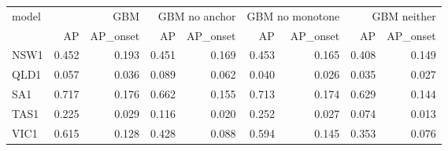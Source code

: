 \begin{tabular}{lrrrrrrrr}
\toprule
model & \multicolumn{2}{r}{GBM} & \multicolumn{2}{r}{GBM no anchor} & \multicolumn{2}{r}{GBM no monotone} & \multicolumn{2}{r}{GBM neither} \\
 & AP & AP\_onset & AP & AP\_onset & AP & AP\_onset & AP & AP\_onset \\
\midrule
NSW1 & 0.452 & 0.193 & 0.451 & 0.169 & 0.453 & 0.165 & 0.408 & 0.149 \\
QLD1 & 0.057 & 0.036 & 0.089 & 0.062 & 0.040 & 0.026 & 0.035 & 0.027 \\
SA1 & 0.717 & 0.176 & 0.662 & 0.155 & 0.713 & 0.174 & 0.629 & 0.144 \\
TAS1 & 0.225 & 0.029 & 0.116 & 0.020 & 0.252 & 0.027 & 0.074 & 0.013 \\
VIC1 & 0.615 & 0.128 & 0.428 & 0.088 & 0.594 & 0.145 & 0.353 & 0.076 \\
\bottomrule
\end{tabular}